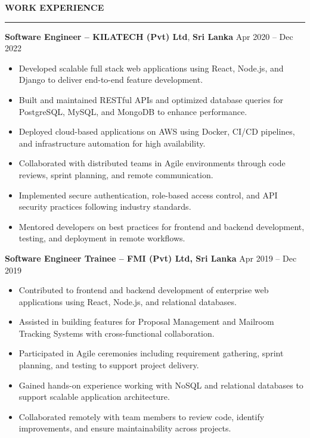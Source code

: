 \documentclass[10pt,letterpaper]{article}
\begin{document}
\vspace{8pt}

\textbf{WORK EXPERIENCE}\\[-8pt]
\noindent\rule{\textwidth}{1pt}

\vspace{-2pt}

\textbf{Software Engineer -- KILATECH (Pvt) Ltd}, \textbf{Sri Lanka} \hfill Apr 2020 -- Dec 2022

\vspace{-1pt}

\begin{itemize}
\item Developed scalable full stack web applications using React, Node.js, and Django to deliver end-to-end feature development.
\item Built and maintained RESTful APIs and optimized database queries for PostgreSQL, MySQL, and MongoDB to enhance performance.
\item Deployed cloud-based applications on AWS using Docker, CI/CD pipelines, and infrastructure automation for high availability.
\item Collaborated with distributed teams in Agile environments through code reviews, sprint planning, and remote communication.
\item Implemented secure authentication, role-based access control, and API security practices following industry standards.
\item Mentored developers on best practices for frontend and backend development, testing, and deployment in remote workflows.
\end{itemize}

\textbf{Software Engineer Trainee -- FMI (Pvt) Ltd, Sri Lanka} \hfill Apr 2019 -- Dec 2019

\vspace{-1pt}

\begin{itemize}
\item Contributed to frontend and backend development of enterprise web applications using React, Node.js, and relational databases.
\item Assisted in building features for Proposal Management and Mailroom Tracking Systems with cross-functional collaboration.
\item Participated in Agile ceremonies including requirement gathering, sprint planning, and testing to support project delivery.
\item Gained hands-on experience working with NoSQL and relational databases to support scalable application architecture.
\item Collaborated remotely with team members to review code, identify improvements, and ensure maintainability across projects.
\end{itemize}
\end{document}
